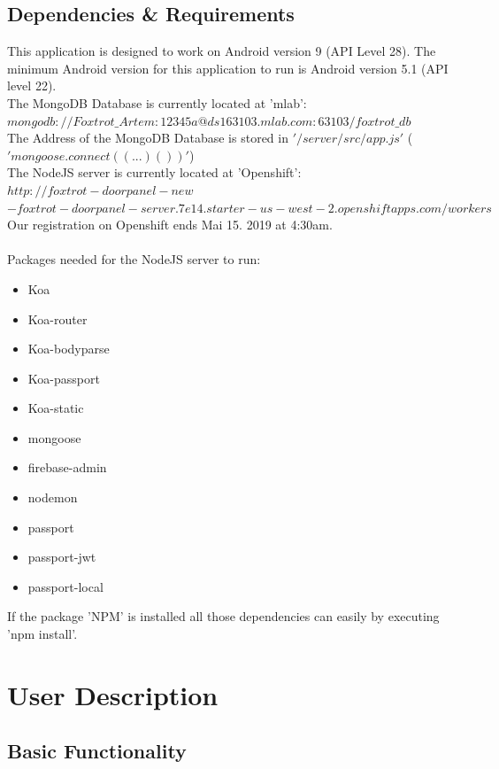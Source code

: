 \documentclass[article,colorback,accentcolor=tud4c, 11pt]{tudreport}
\begin{document}
\subsection{Dependencies \& Requirements}

This application is designed to work on Android version 9 (API Level 28).
The minimum Android version for this application to run is Android version 5.1 (API level 22). \\

The MongoDB Database is currently located at 'mlab':\\
$mongodb://Foxtrot\_Artem:12345a@ds163103.mlab.com:63103/foxtrot\_db$\\
The Address of the MongoDB Database is stored in $'/server/src/app.js'$ ($'mongoose.connect((...)())'$)\\

The NodeJS server is currently located at 'Openshift': $http://foxtrot-doorpanel-new$\\$-foxtrot-doorpanel-server.7e14.starter-us-west-2.openshiftapps.com/workers$\\ 
Our registration on Openshift ends Mai 15. 2019 at 4:30am.\\ \\
Packages needed for the NodeJS server to run:
\begin{itemize}
	\item Koa
	\item Koa-router
	\item Koa-bodyparse
	\item Koa-passport
	\item Koa-static
	\item mongoose
	\item firebase-admin
	\item nodemon
	\item passport
	\item passport-jwt
	\item passport-local
\end{itemize}

If the package 'NPM' is installed all those dependencies can easily by executing 'npm install'.\\

	
\section{User Description}

	
\subsection{Basic Functionality}
\end{document}
